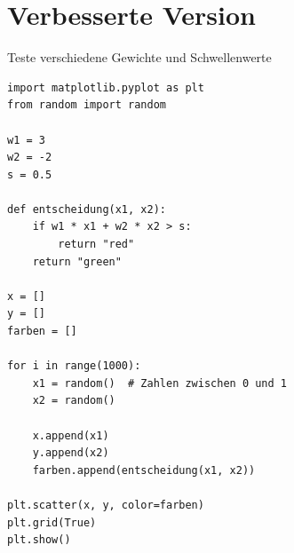\documentclass[]{scrreprt}
\begin{document}
\newpage

\section*{Verbesserte Version}

Teste verschiedene Gewichte und Schwellenwerte 

\begin{lstlisting}
import matplotlib.pyplot as plt
from random import random

w1 = 3
w2 = -2
s = 0.5

def entscheidung(x1, x2):
    if w1 * x1 + w2 * x2 > s:
        return "red"
    return "green"

x = []
y = []
farben = []

for i in range(1000):
    x1 = random()  # Zahlen zwischen 0 und 1
    x2 = random()

    x.append(x1)
    y.append(x2)
    farben.append(entscheidung(x1, x2))
    
plt.scatter(x, y, color=farben)
plt.grid(True)
plt.show()
\end{lstlisting}
\end{document}
